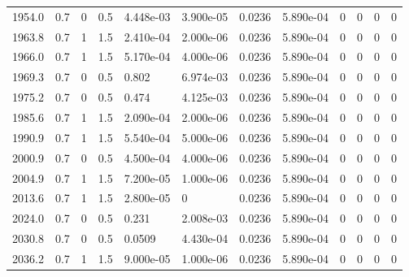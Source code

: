 \documentclass[preview]{standalone}
\begin{document}
{{{{{{{{{\begin{tabular}{L{1.2cm}C{1.2cm} C{0.3cm}C{0.5cm} C{1.4cm}C{1.4cm} C{1.4cm}C{1.4cm} C{1.6cm}C{1.6cm} C{1.6cm}C{1.6cm}}
  1954.0  &   0.7  & 0     & 0.5 &  4.448e-03  & 3.900e-05  &  0.0236&   5.890e-04& 0 & 0   &  0 & 0  \\ 
  1963.8  &   0.7  & 1     & 1.5 &  2.410e-04  & 2.000e-06  &  0.0236&   5.890e-04& 0 & 0   &  0 & 0  \\ 
  1966.0  &   0.7  & 1     & 1.5 &  5.170e-04  & 4.000e-06  &  0.0236&   5.890e-04& 0 & 0   &  0 & 0  \\ 
  1969.3  &   0.7  & 0     & 0.5 &  0.802  & 6.974e-03  &  0.0236&   5.890e-04& 0 & 0   &  0 & 0  \\ 
  1975.2  &   0.7  & 0     & 0.5 &  0.474  & 4.125e-03  &  0.0236&   5.890e-04& 0 & 0   &  0 & 0  \\ 
  1985.6  &   0.7  & 1     & 1.5 &  2.090e-04  & 2.000e-06  &  0.0236&   5.890e-04& 0 & 0   &  0 & 0  \\ 
  1990.9  &   0.7  & 1     & 1.5 &  5.540e-04  & 5.000e-06  &  0.0236&   5.890e-04& 0 & 0   &  0 & 0  \\ 
  2000.9  &   0.7  & 0     & 0.5 &  4.500e-04  & 4.000e-06  &  0.0236&   5.890e-04& 0 & 0   &  0 & 0  \\ 
  2004.9  &   0.7  & 1     & 1.5 &  7.200e-05  & 1.000e-06  &  0.0236&   5.890e-04& 0 & 0   &  0 & 0  \\ 
  2013.6  &   0.7  & 1     & 1.5 &  2.800e-05  & 0  &  0.0236&   5.890e-04& 0 & 0   &  0 & 0  \\ 
  2024.0  &   0.7  & 0     & 0.5 &  0.231  & 2.008e-03  &  0.0236&   5.890e-04& 0 & 0   &  0 & 0  \\ 
  2030.8  &   0.7  & 0     & 0.5 &  0.0509  & 4.430e-04  &  0.0236&   5.890e-04& 0 & 0   &  0 & 0  \\ 
  2036.2  &   0.7  & 1     & 1.5 &  9.000e-05  & 1.000e-06  &  0.0236&   5.890e-04& 0 & 0   &  0 & 0  \\ 
\hline 
\end{tabular} 

}}}}}}}}}
\end{document}
